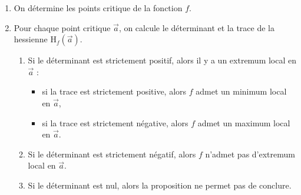 \begin{met}
	\begin{enumerate}
		\item On détermine les points critique de la fonction $f$.
		\item Pour chaque point critique $\vec{a}$, on calcule le déterminant et la trace de la hessienne $\mathrm{H}_f(\vec{a})$.
			\begin{enumerate}
				\item Si le déterminant est strictement positif, alors il y a un extremum local en $\vec{a}$ :
					\begin{itemize}
						\item si la trace est strictement positive, alors $f$ admet un minimum local en $\vec{a}$,
						\item si la trace est strictement négative, alors $f$ admet un maximum local en $\vec{a}$.
					\end{itemize}
				\item Si le déterminant est strictement négatif, alors $f$ n'admet pas d'extremum local en $\vec{a}$.
				\item Si le déterminant est nul, alors la proposition ne permet pas de conclure.
			\end{enumerate}
	\end{enumerate}
\end{met}

